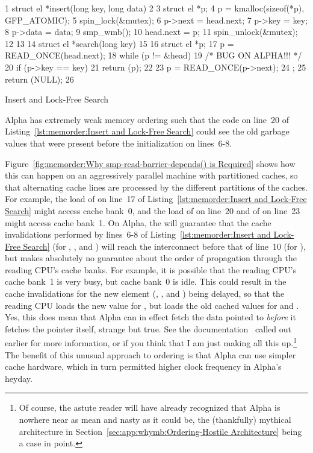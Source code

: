 \begin{listing}[tbp]
{ \scriptsize
\begin{verbbox}
  1 struct el *insert(long key, long data)
  2 {
  3     struct el *p;
  4     p = kmalloc(sizeof(*p), GFP_ATOMIC);
  5     spin_lock(&mutex);
  6     p->next = head.next;
  7     p->key = key;
  8     p->data = data;
  9     smp_wmb();
 10     head.next = p;
 11     spin_unlock(&mutex);
 12 }
 13
 14 struct el *search(long key)
 15 {
 16     struct el *p;
 17     p = READ_ONCE(head.next);
 18     while (p != &head) {
 19         /* BUG ON ALPHA!!! */
 20         if (p->key == key) {
 21             return (p);
 22         }
 23         p = READ_ONCE(p->next);
 24     };
 25     return (NULL);
 26 }
\end{verbbox}
}
\centering
\theverbbox
\caption{Insert and Lock-Free Search}
\label{lst:memorder:Insert and Lock-Free Search}
\end{listing}

Alpha has extremely weak memory ordering
such that the code on line~20 of
Listing~\ref{lst:memorder:Insert and Lock-Free Search} could see the old
garbage values that were present before the initialization on lines~6-8.

Figure~\ref{fig:memorder:Why smp-read-barrier-depends() is Required}
shows how this can happen on
an aggressively parallel machine with partitioned caches, so that
alternating cache lines are processed by the different partitions
of the caches.
For example, the load of  on line~17 of
Listing~\ref{lst:memorder:Insert and Lock-Free Search}
might access cache bank~0,
and the load of  on line~20 and of  on line~23
might access cache bank~1.
On Alpha, the  will guarantee that the cache invalidations
performed by lines~6-8 of
Listing~\ref{lst:memorder:Insert and Lock-Free Search}
(for , , and ) will reach
the interconnect before that of line~10 (for ), but
makes absolutely no guarantee about the order of
propagation through the reading CPU's cache banks.
For example, it is possible that the reading CPU's cache bank~1 is very
busy, but cache bank~0 is idle.
This could result in the cache invalidations for the new element
(, , and ) being
delayed, so that the reading CPU loads the new value for ,
but loads the old cached values for  and .
Yes, this does mean that Alpha can in effect fetch
the data pointed to {\em before} it fetches the pointer itself, strange
but true.
See the documentation~\cite{Compaq01,WilliamPugh2000Gharachorloo}
called out earlier for more information,
or if you think that I am just making all this up.\footnote{
	Of course, the astute reader will have already recognized that
	Alpha is nowhere near as mean and nasty as it could be,
	the (thankfully) mythical architecture in
	Section~\ref{sec:app:whymb:Ordering-Hostile Architecture}
	being a case in point.}
The benefit of this unusual approach to ordering is that Alpha can use
simpler cache hardware, which in turn permitted higher clock frequency
in Alpha's heyday.

